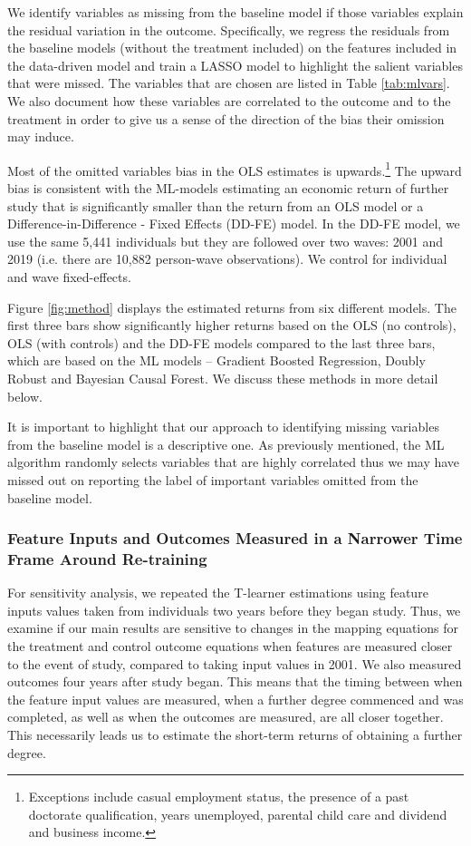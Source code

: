 \documentclass[12pt, a4paper]{article}
\begin{document}
We identify variables as missing from the baseline model if those variables explain the residual variation in the outcome. Specifically, we regress the residuals from the baseline models (without the treatment included) on the features included in the data-driven model and train a LASSO model to highlight the salient variables that were missed. The variables that are chosen are listed in Table \ref{tab:mlvars}. We also document how these variables are correlated to the outcome and to the treatment in order to give us a sense of the direction of the bias their omission may induce. 

Most of the omitted variables bias in the OLS estimates is upwards.\footnote{Exceptions include casual employment status, the presence of a past doctorate qualification, years unemployed, parental child care and dividend and business income.} The upward bias is consistent with the ML-models estimating an economic return of further study that is significantly smaller than the return from an OLS model or a Difference-in-Difference - Fixed Effects (DD-FE)  model. In the DD-FE model, we use the same 5,441 individuals but they are followed over two waves: 2001 and 2019 (i.e. there are 10,882 person-wave observations). We control for individual and wave fixed-effects. 

Figure \ref{fig:method} displays the estimated returns from six different
models. The first three bars show significantly higher returns based on the OLS
(no controls), OLS (with controls) and the DD-FE models compared to the last
three bars, which are based on the ML models -- Gradient Boosted Regression,
Doubly Robust and Bayesian Causal Forest. We discuss these methods in more
detail below. 

It is important to highlight that our approach to identifying missing variables
from the baseline model is a descriptive one. As previously mentioned,
the ML algorithm randomly selects variables that are highly correlated thus we
may have missed out on reporting the label of important variables omitted from
the baseline model.


\subsubsection{Feature Inputs and Outcomes Measured in a Narrower Time Frame Around Re-training}


For sensitivity analysis, we repeated the T-learner estimations using feature
inputs values taken from individuals two years before they began study. Thus, we
examine if our main results are sensitive to changes in the mapping equations
for the treatment and control outcome equations when features are measured
closer to the event of study, compared to taking input values in 2001. We also
measured outcomes four years after study began. This means that the timing
between when the feature input values are measured, when a further degree
commenced and was completed, as well as when the outcomes are measured, are all
closer together. This necessarily leads us to estimate the short-term returns
of obtaining a further degree. 
\end{document}
